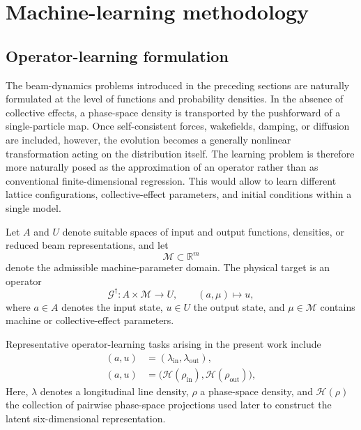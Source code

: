 \documentclass[11pt,a4paper]{article}
\begin{document}
\begin{sloppypar}
\section{Machine-learning methodology}
\label{sec:methodology}

\subsection{Operator-learning formulation}
\label{subsec:operator_learning_formulation}

The beam-dynamics problems introduced in the preceding sections are naturally formulated at the level of functions and probability densities. In the absence of collective effects, a phase-space density is transported by the pushforward of a single-particle map. Once self-consistent forces, wakefields, damping, or diffusion are included, however, the evolution becomes a generally nonlinear transformation acting on the distribution itself. The learning problem is therefore more naturally posed as the approximation of an operator rather than as conventional finite-dimensional regression. This would allow to learn different lattice configurations, collective-effect parameters, and initial conditions within a single model.

Let $A$ and $U$ denote suitable spaces of input and output functions, densities, or reduced beam representations, and let
\begin{equation}
\mathcal{M}\subset\mathbb{R}^{m}
\end{equation}
denote the admissible machine-parameter domain. The physical target is an operator
\begin{equation}
\mathcal{G}^{\dagger}
:
A\times\mathcal{M}
\longrightarrow
U,
\qquad
(a,\mu)\longmapsto u,
\label{eq:true_operator_revised}
\end{equation}
where $a\in A$ denotes the input state, $u\in U$ the output state, and $\mu\in\mathcal{M}$ contains machine or collective-effect parameters.

Representative operator-learning tasks arising in the present work include
\begin{align}
(a,u)
&=
(\lambda_{\mathrm{in}},\lambda_{\mathrm{out}}),
\label{eq:operator_task_density}
\\
(a,u)
&=
\bigl(
\mathcal{H}(\rho_{\mathrm{in}}),
\mathcal{H}(\rho_{\mathrm{out}})
\bigr),
\label{eq:operator_task_histograms}
\end{align}
Here, $\lambda$ denotes a longitudinal line density, $\rho$ a phase-space density, and $\mathcal{H}(\rho)$ the collection of pairwise phase-space projections used later to construct the latent six-dimensional representation.


\end{sloppypar}
\end{document}
